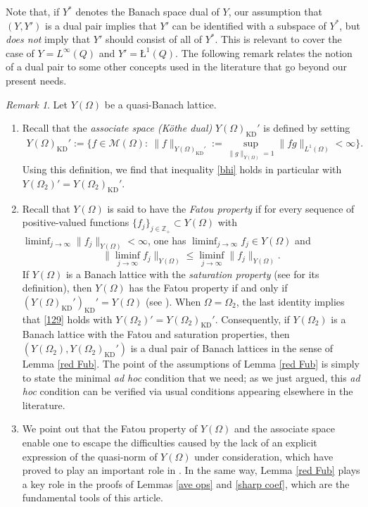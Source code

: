 \documentclass[11pt, reqno]{amsart}
\theoremstyle{definition}
\theoremstyle{remark}
\newtheorem{remark}[theorem]{Remark}
\numberwithin{equation}{section}
\newcommand{\Z}{\mathbb Z}
\newcommand{\aveL}{\textit{\L}}
\begin{document}
Note that, if $Y^*$ denotes the Banach space dual of $Y$,
our assumption that $(Y,Y')$ is a dual pair implies that $Y'$
can be identified with a subspace of $Y^*$, but {\em does not}
imply that $Y'$ should consist of all of $Y^*$.
This is relevant to cover the case of $Y=L^\infty(Q)$ and $Y'=\aveL^1(Q)$.
The following remark relates the notion of a dual pair to some other concepts used in the literature that go beyond our present needs.

\begin{remark}\label{it:ii} Let $Y(\Omega)$ be a quasi-Banach lattice.
\begin{enumerate}[\rm(i)]
\item\label{satisa} Recall that the \emph{associate space (K\"othe dual)}
$Y(\Omega)_{\textrm{KD}}'$ is defined
by setting
\begin{align*}
Y(\Omega)_{\textrm{KD}}':=\Big\{f\in\mathscr{M}(\Omega):\ \|f\|_{Y(\Omega)_{\textrm{KD}}'}
:=\sup_{\|g\|_{Y(\Omega)}=1}\|fg\|_{L^1(\Omega)}<\infty\Big\}.
\end{align*}
Using this definition, we find that inequality \eqref{bhi} holds in particular with
$Y(\Omega_2)'=Y(\Omega_2)_{\textrm{KD}}' $.

\item Recall that $Y(\Omega)$ is said to have the \emph{Fatou property}
if for every sequence of positive-valued functions
$\{f_j\}_{j\in\Z_+}\subset Y(\Omega)$ with $\liminf_{j\to\infty}\|f_j\|_{Y(\Omega)}<\infty$,
one has $\liminf_{j\to\infty}f_j\in Y(\Omega)$ and
\begin{equation*}
  \Big\|\liminf_{j\to\infty}f_j\Big\|_{Y(\Omega)}
\le\liminf_{j\to\infty}\|f_j\|_{Y(\Omega)}.
\end{equation*}
If $Y(\Omega)$ is a Banach lattice with the {\em saturation property}
(see \cite[p.\,249]{LN24} for its definition), then $Y(\Omega)$
has the Fatou property if and only if $(Y(\Omega)_{\textrm{KD}}')_{\textrm{KD}}'=Y(\Omega)$
(see \cite[Theorem 3.6]{LN24}).
When $\Omega=\Omega_2$, the last identity implies that \eqref{129} holds with $Y(\Omega_2)'=Y(\Omega_2)_{\textrm{KD}}'$.
Consequently, if $Y(\Omega_2)$ is a Banach lattice with
the Fatou and saturation properties, then $(Y(\Omega_2),Y(\Omega_2)_{\textrm{KD}}')$ is a
dual pair of Banach lattices in the sense of Lemma \ref{red Fub}.
The point of the assumptions of Lemma \ref{red Fub} is simply to state the minimal {\em ad hoc} condition that we need; as we just argued, this {\em ad hoc} condition can be verified via usual conditions appearing elsewhere in the literature.

\item We point out that the Fatou property of $Y(\Omega)$ and the associate space
enable one to escape the difficulties caused by
the lack of an explicit expression of the quasi-norm of $Y(\Omega)$ under consideration,
which have proved to play an important role in \cite{CWYZ,Ho24,HCY22,SHYY}.
In the same way, Lemma \ref{red Fub} plays a key role in the proofs of Lemmas
\ref{ave ops} and \ref{sharp coef}, which are the fundamental tools of this article.
\end{enumerate}
\end{remark}
\end{document}
